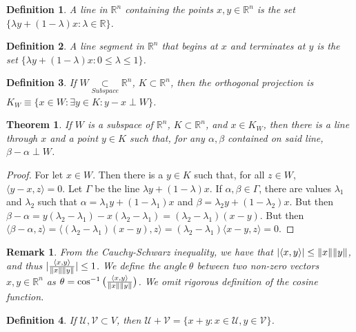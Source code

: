 \documentclass[12pt,oneside]{book}
\theoremstyle{mystyle}
\newtheorem{theorem}{Theorem}[section]
\newtheorem{definition}{Definition}[section]
\newtheorem{remark}{Remark}[section]
\begin{document}
\begin{definition}
A line in $\mathbb{R}^n$ containing the points $x,y\in \mathbb{R}^n$ is the set $\{\lambda y + (1-\lambda)x: \lambda \in \mathbb{R}\}$.
\end{definition}

\begin{definition}
A line segment in $\mathbb{R}^n$ that begins at $x$ and terminates at $y$ is the set $\{\lambda y + (1-\lambda)x: 0\leq \lambda \leq 1 \}$.
\end{definition}

\begin{definition}
If $W\underset{Subspace}\subset\mathbb{R}^n$, $K \subset \mathbb{R}^n$, then the orthogonal projection is $K_{W}\equiv\{x\in W: \exists y\in K: y-x \perp W\}$.
\end{definition}

\begin{theorem}
If $W$ is a subspace of $\mathbb{R}^n$, $K \subset \mathbb{R}^n$, and $x\in K_{W}$, then there is a line through $x$ and a point $y\in K$ such that, for any $\alpha, \beta$ contained on said line, $\beta-\alpha \perp W$.
\end{theorem}
\begin{proof}
For let $x\in W$. Then there is a $y\in K$ such that, for all $z\in W$, $\langle y-x,z\rangle = 0$. Let $\Gamma$ be the line $\lambda y + (1-\lambda)x$. If $\alpha,\beta \in \Gamma$, there are values $\lambda_1$ and $\lambda_2$ such that $\alpha = \lambda_1 y+ (1-\lambda_1)x$ and $\beta = \lambda_2 y +(1-\lambda_2)x$. But then $\beta-\alpha = y(\lambda_2-\lambda_1)-x(\lambda_2-\lambda_1) = (\lambda_2-\lambda_1)(x-y)$. But then $\langle \beta - \alpha,z\rangle = \langle (\lambda_2-\lambda_1)(x-y),z\rangle = (\lambda_2-\lambda_1)\langle x-y,z \rangle = 0$.
\end{proof}

\begin{remark}
From the Cauchy-Schwarz inequality, we have that $|\langle x,y \rangle| \leq \norm{x}\norm{y}$, and thus $|\frac{\langle x,y \rangle}{\norm{x}\norm{y}}| \leq 1$. We define the $angle\ \theta$ between two non-zero vectors $x,y\in \mathbb{R}^n$ as $\theta=\cos^{-1}\big(\frac{\langle x,y \rangle}{\norm{x}\norm{y}}\big)$. We omit rigorous definition of the cosine function.
\end{remark}

\begin{definition}
If $\mathcal{U},\mathcal{V}\subset V$, then $\mathcal{U}+\mathcal{V} = \{x+y:x\in \mathcal{U},y\in \mathcal{V}\}$.
\end{definition}
\end{document}
